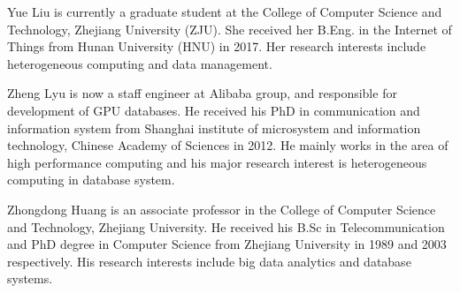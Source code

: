 \documentclass[10pt,journal,compsoc]{IEEEtran}
\begin{document}
\begin{IEEEbiography}
	{Yue Liu} is currently a graduate student at the College of Computer Science and Technology, Zhejiang University (ZJU). She received her B.Eng. in the Internet of Things from Hunan University (HNU) in 2017. Her research interests include heterogeneous computing and data management.
\end{IEEEbiography}
\vspace*{-2\baselineskip}

\begin{IEEEbiography}
	{Zheng Lyu} is now a staff engineer at Alibaba group, and responsible for development of GPU databases. He received his PhD in communication and information system from Shanghai institute of microsystem and information technology, Chinese Academy of Sciences in 2012. He mainly works in the area of high performance computing and his major research interest is heterogeneous computing in database system.
\end{IEEEbiography}
\vspace*{-2\baselineskip}

\begin{IEEEbiography}
	{Zhongdong Huang} is an associate professor in the College of Computer Science and Technology, Zhejiang University. He received his B.Sc in Telecommunication and PhD degree in Computer Science from Zhejiang University in 1989 and 2003 respectively. His research interests include big data analytics and database systems.
\end{IEEEbiography}
\vspace*{-2\baselineskip}
\end{document}
